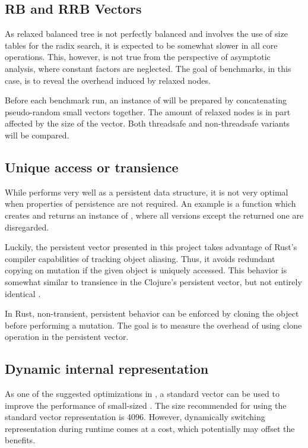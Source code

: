 \subsection{RB and RRB Vectors}
As relaxed balanced tree is not perfectly balanced and involves the use of size tables for the radix search, it is expected to be somewhat slower in all core operations. This, however, is not true from the perspective of asymptotic analysis, where constant factors are neglected. The goal of benchmarks, in this case, is to reveal the overhead induced by relaxed nodes. 

Before each benchmark run, an instance of \rrbvec{} will be prepared by concatenating pseudo-random small vectors together. The amount of relaxed nodes is in part affected by the size of the vector. Both threadsafe and non-threadsafe variants will be compared. 


\subsection{Unique access or transience}
While \rrbvec{} performs very well as a persistent data structure, it is not very optimal when properties of persistence are not required. An example is a function which creates and returns an instance of \rrbvec{}, where all versions except the returned one are disregarded.

Luckily, the persistent vector presented in this project takes advantage of Rust's compiler capabilities of tracking object aliasing. Thus, it avoids redundant copying on mutation if the given object is uniquely accessed. This behavior is somewhat similar to transience in the Clojure's persistent vector, but not entirely identical . 

In Rust, non-transient, persistent behavior can be enforced by cloning the object before performing a mutation. The goal is to measure the overhead of using clone operation in the persistent vector. 

\subsection{Dynamic internal representation}
As one of the suggested optimizations in , a standard vector can be used to improve the performance of small-sized \rrbvec{}. The size recommended for using the standard vector representation is 4096. However, dynamically switching representation during runtime comes at a cost, which potentially may offset the benefits. 

